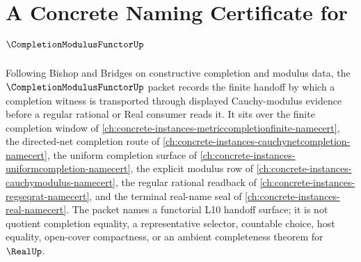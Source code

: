 \chapter{A Concrete Naming Certificate for $\CompletionModulusFunctorUp$}
\label{ch:concrete-instances-completion-modulus-functor-namecert}

Following Bishop and Bridges on constructive completion and modulus data, the $\CompletionModulusFunctorUp$ packet records the finite handoff by which a completion witness is transported through displayed Cauchy-modulus evidence before a regular rational or Real consumer reads it. It sits over the finite completion window of \autoref{ch:concrete-instances-metriccompletionfinite-namecert}, the directed-net completion route of \autoref{ch:concrete-instances-cauchynetcompletion-namecert}, the uniform completion surface of \autoref{ch:concrete-instances-uniformcompletion-namecert}, the explicit modulus row of \autoref{ch:concrete-instances-cauchymodulus-namecert}, the regular rational readback of \autoref{ch:concrete-instances-regseqrat-namecert}, and the terminal real-name seal of \autoref{ch:concrete-instances-real-namecert}. The packet names a functorial L10 handoff surface; it is not quotient completion equality, a representative selector, countable choice, host equality, open-cover compactness, or an ambient completeness theorem for $\RealUp$.

